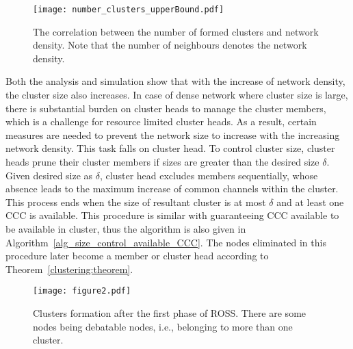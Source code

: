 \documentclass[journal,comsoc]{IEEEtran}
\theoremstyle{mytheoremstyle}
\theoremstyle{mytheoremstyle}
\theoremstyle{mytheoremstyle}
\newcommand{\ie}{i.e., }
\begin{document}
\begin{figure}[h]
  \centering
  \texttt{[image: number\_clusters\_upperBound.pdf]}
  \caption{The correlation between the number of formed clusters and network density. Note that the number of neighbours denotes the network density.}
  \label{number_clusters_scale}
\end{figure}

Both the analysis and simulation show that with the increase of network density, the cluster size also increases.
In case of dense network where cluster size is large, there is substantial burden on cluster heads to manage the cluster members, which is a challenge for resource limited cluster heads.
As a result, certain measures are needed to prevent the network size to increase with the increasing network density.
This task falls on cluster head.
To control cluster size, cluster heads prune their cluster members if sizes are greater than the desired size $\delta$.
Given desired size as $\delta$, cluster head excludes members sequentially, whose absence leads to the maximum increase of common channels within the cluster.
This process ends when the size of resultant cluster is at most $\delta$ and at least one CCC is available.
This procedure is similar with guaranteeing CCC available to be available in cluster, thus the algorithm is also given in Algorithm~\ref{alg_size_control_available_CCC}.
The nodes eliminated in this procedure later become a member or cluster head according to Theorem~\ref{clustering:theorem}.






\begin{figure}[ht!]
  \centering
  \texttt{[image: figure2.pdf]}
  \caption{Clusters formation after the first phase of ROSS. There are some nodes being debatable nodes, \ie belonging to more than one cluster.}
  \label{fig2}
\end{figure}
\end{document}
